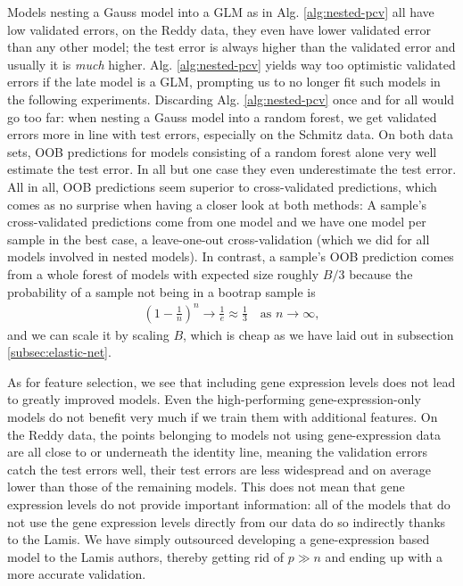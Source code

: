 Models 
nesting a Gauss model into a GLM as in Alg. \ref{alg:nested-pcv} all have low validated errors, on 
the Reddy data, they even have lower validated error than any other model; the test error is 
always higher than the validated error and usually it is \textit{much} higher. Alg. \ref{alg:nested-pcv} 
yields way too optimistic validated errors if the late model is a GLM, prompting us to no longer 
fit such models in the following experiments. Discarding Alg. \ref{alg:nested-pcv} once and for all
would go too far: when nesting a Gauss model into a random forest, we get validated errors more in 
line with test errors, especially on the Schmitz data. On both data sets, OOB predictions for 
models consisting of a random forest alone very well estimate the test error. In all but one case 
they even underestimate the test error. All in all, OOB predictions seem superior to 
cross-validated predictions, which comes as no surprise when having a closer look at both 
methods: A sample's cross-validated predictions come from one model and we have one model per 
sample in the best case, a leave-one-out cross-validation (which we did for all models involved in 
nested models). In contrast, a sample's OOB prediction comes from a whole forest of models with 
expected size roughly $B/3$ because the probability of a sample not being in a bootrap sample 
is
\begin{align}
    \left( 1 - \frac{1}{n} \right)^n \to \frac{1}{e} \approx \frac{1}{3} \quad \text{as } n \to 
    \infty,
\end{align}
and we can scale it by scaling $B$, which is cheap as we have laid out in subsection 
\ref{subsec:elastic-net}.

As for feature selection, we see that including gene expression levels does not lead to greatly 
improved models. Even the high-performing gene-expression-only models do not benefit very much if 
we train them with additional features. On the Reddy data, the points belonging to models not using 
gene-expression data are all close to or underneath the identity line, meaning the validation errors 
catch the test errors well, their test errors are less widespread and on average lower than those 
of the remaining models. This does not mean that gene expression levels do not provide important 
information: all of the models that do not use the gene expression levels directly from our data 
do so indirectly thanks to the Lamis. We have simply outsourced developing a gene-expression based 
model to the Lamis authors, thereby getting rid of $p \gg n$ and ending up with a more accurate 
validation.

